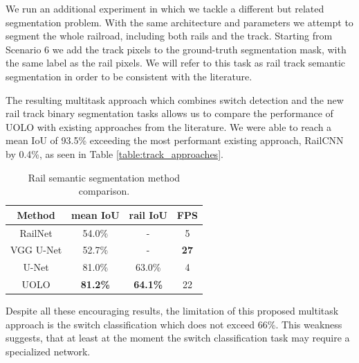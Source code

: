 \documentclass[conference]{IEEEtran}
\begin{document}
We run an additional experiment in which we tackle a different but related segmentation problem. With the same architecture and parameters we attempt to segment the whole railroad, including both rails and the track. Starting from Scenario 6 we add the track pixels to the ground-truth segmentation mask, with the same label as the rail pixels. We will refer to this task as rail track semantic segmentation in order to be consistent with the literature.

The resulting multitask approach which combines switch detection and the new rail track binary segmentation tasks allows us to compare the performance of UOLO with existing approaches from the literature. We were able to reach a mean IoU of 93.5\% exceeding the most performant existing approach, RailCNN \cite{belyaev2020railroad} by 0.4\%, as seen in Table \ref{table:track_approaches}. 

\begin{table}[h!]
\begin{center}
\caption{Rail semantic segmentation method comparison.
}
\begin{tabular}{c c c c} 
 \hline
 \textbf{Method} & \textbf{mean IoU} & \textbf{rail IoU} & \textbf{FPS}\\ [0.5ex] 
 \hline\hline
 RailNet \cite{li2020railnet} & 54.0\% & - & 5 \\ 
 VGG U-Net \cite{jahan2021anomaly} & 52.7\% & - & \textbf{27}\\
 U-Net \cite{alexandrescu2022dynamic} & 81.0\% & 63.0\% & 4 \\ 
 \hline
 UOLO & \textbf{81.2\%} & \textbf{64.1\%} & 22 \\ [1ex] 
 \hline
\end{tabular}
\label{table:rail_sota_approaches}
\end{center}
\end{table}

Despite all these encouraging results, the limitation of this proposed multitask approach is the switch classification which does not exceed 66\%. This weakness suggests, that at least at the moment the switch classification task may require a specialized network.

\end{document}
